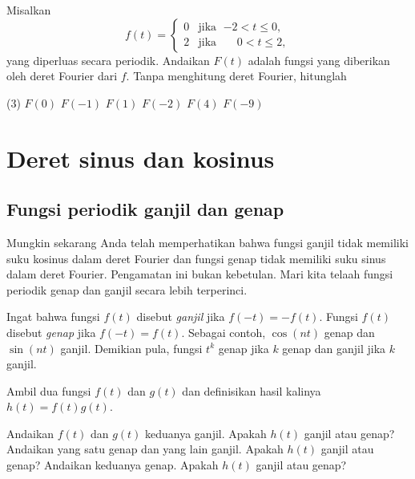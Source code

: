 \begin{exercise}
Misalkan
\begin{equation*}
f(t) = 
\begin{cases}
0 & \text{jika } \; {-2} < t \leq 0, \\
2 & \text{jika } \; \phantom{-}0 < t \leq 2,
\end{cases}
\end{equation*}
yang diperluas secara periodik.  Andaikan $F(t)$ adalah fungsi yang diberikan
oleh deret Fourier dari $f$.  Tanpa menghitung deret Fourier,
hitunglah
\begin{tasks}(3)
\task $F(0)$
\task $F(-1)$
\task $F(1)$
\task $F(-2)$
\task $F(4)$
\task $F(-9)$
\end{tasks}
\end{exercise}


\sectionnewpage
\section{Deret sinus dan kosinus}
\label{sec:scs}



\subsection{Fungsi periodik ganjil dan genap}

Mungkin sekarang Anda telah memperhatikan bahwa fungsi ganjil tidak memiliki suku kosinus dalam 
deret Fourier dan fungsi genap tidak memiliki suku sinus dalam deret Fourier.
Pengamatan ini bukan kebetulan.  Mari kita telaah fungsi periodik genap dan ganjil
secara lebih terperinci.

Ingat bahwa fungsi $f(t)$ disebut \emph{ganjil} jika $f(-t) =
-f(t)$.  Fungsi $f(t)$ disebut \emph{genap} jika
$f(-t) = f(t)$.  Sebagai contoh, $\cos (n t)$ genap dan $\sin (n t)$ ganjil.
Demikian pula, fungsi $t^k$ genap jika $k$ genap dan ganjil jika $k$ ganjil.

\begin{exercise}
Ambil dua fungsi $f(t)$ dan $g(t)$ dan definisikan hasil kalinya $h(t) =
f(t)g(t)$.
\begin{tasks}
\task Andaikan $f(t)$ dan $g(t)$ keduanya ganjil.  Apakah $h(t)$ ganjil atau genap?
\task Andaikan yang satu genap dan yang lain ganjil.  Apakah $h(t)$ ganjil atau genap?
\task Andaikan keduanya genap.  Apakah $h(t)$ ganjil atau genap?
\end{tasks}
\end{exercise}

